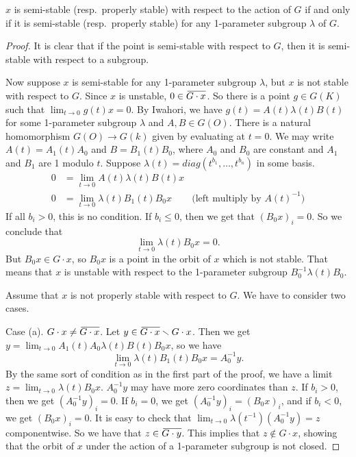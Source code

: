 \begin{theorem}
 $x$ is semi-stable (resp.~properly stable) with respect to the action of $G$ if and only if it is semi-stable (resp.~properly stable) for any 1-parameter subgroup $\lambda$ of $G$.
\end{theorem}
\begin{proof}
 It is clear that if the point is semi-stable with respect to $G$, then it is semi-stable with respect to a subgroup.
 
 Now suppose $x$ is semi-stable for any 1-parameter subgroup $\lambda$, but $x$ is not stable with respect to $G$. Since $x$ is unstable, $0\in \bbar{G\cdot x}$. So there is a point $g\in G(K)$ such that $\lim_{t\to 0} g(t)x=0$. By Iwahori, we have $g(t)=A(t)\lambda(t)B(t)$ for some 1-parameter subgroup $\lambda$ and $A,B\in G(O)$. There is a natural homomorphism $G(O)\to G(k)$ given by evaluating at $t=0$. We may write $A(t)=A_1(t)A_0$ and $B=B_1(t)B_0$, where $A_0$ and $B_0$ are constant and $A_1$ and $B_1$ are 1 modulo $t$. Suppose $\lambda(t)=diag(t^{b_1},\dots, t^{b_n})$ in some basis.
 \begin{align*}
  0 &= \lim_{t\to 0} A(t)\lambda(t)B(t)x\\
  0 &= \lim_{t\to 0} \lambda(t) B_1(t)B_0 x & \text{(left multiply by $A(t)^{-1}$)}
 \end{align*}
 If all $b_i>0$, this is no condition. If $b_i\le 0$, then we get that $(B_0x)_i=0$. So we conclude that
 \[
  \lim_{t\to 0} \lambda(t) B_0 x=0.
 \]
  But $B_0x\in G\cdot x$, so $B_0 x$ is a point in the orbit of $x$ which is not stable. That means that $x$ is unstable with respect to the 1-parameter subgroup $B_0^{-1}\lambda(t)B_0$.
 
 Assume that $x$ is not properly stable with respect to $G$. We have to consider two cases.
  
 Case (a). $G\cdot x\neq \bbar{G\cdot x}$. Let $y\in \bbar{G\cdot x}\setminus G\cdot x$. Then we get $y=\lim_{t\to 0} A_1(t)A_0\lambda(t)B(t)B_0x$, so we have
 \[
  \lim_{t\to 0} \lambda(t) B_1(t)B_0x = A_0^{-1} y.
 \]
 By the same sort of condition as in the first part of the proof, we have a limit $z=\lim_{t\to 0} \lambda(t)B_0 x$. $A_0^{-1}y$ may have more zero coordinates than $z$. If $b_i>0$, then we get $(A_0^{-1}y)_i=0$. If $b_i=0$, we get $(A_0^{-1}y)_i=(B_0x)_i$, and if $b_i<0$, we get $(B_0x)_i=0$. It is easy to check that $\lim_{t\to 0} \lambda(t^{-1})(A_0^{-1}y)=z$ componentwise. So we have that $z\in \bbar{G\cdot y}$. This implies that $z\not\in G\cdot x$, showing that the orbit of $x$ under the action of a 1-parameter subgroup is not closed.
 

\end{proof}
